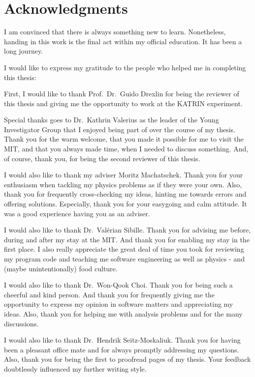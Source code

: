 \chapter*{Acknowledgments}
I am convinced that there is always something new to learn. Nonetheless, handing in this work is the final act within my official education. It has been a long journey. 

I would like to express my gratitude to the people who helped me in completing this thesis:

First, I would like to thank Prof.~Dr.~Guido Drexlin for being the reviewer of this thesis and giving me the opportunity to work at the KATRIN experiment.

Special thanks goes to Dr.~Kathrin Valerius as the leader of the Young Investigator Group that I enjoyed being part of over the course of my thesis. Thank you for the warm welcome, that you made it possible for me to visit the MIT, and that you always made time, when I needed to discuss something. And, of course, thank you, for being the second reviewer of this thesis. 

I would also like to thank my adviser Moritz Machatschek. Thank you for your enthusiasm when tackling my physics problems as if they were your own. Also, thank you for frequently cross-checking my ideas, hinting me towards errors and offering solutions. Especially, thank you for your easygoing and calm attitude. It was a good experience having you as an adviser.

I would also like to thank Dr.~Valérian Sibille. Thank you for advising me before, during and after my stay at the MIT. And thank you for enabling my stay in the first place. I also really appreciate the great deal of time you took for reviewing my program code and teaching me software engineering as well as physics - and (maybe unintentionally) food culture.

I would also like to thank Dr.~Won-Qook Choi. Thank you for being such a cheerful and kind person. And thank you for frequently giving me the opportunity to express my opinion in software matters and appreciating my ideas. Also, thank you for helping me with analysis problems and for the many discussions.


I would also like to thank Dr.~Hendrik Seitz-Moskaliuk. Thank you for having been a pleasant office mate and for always promptly addressing my questions. Also, thank you for being the first to proofread pages of my thesis. Your feedback doubtlessly influenced my further writing style.

